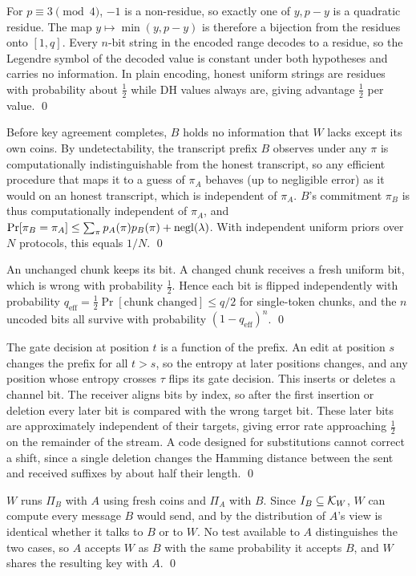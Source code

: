 For $p \equiv 3 \pmod 4$, $-1$ is a non-residue, so exactly one of $y, p-y$ is a quadratic residue. The map $y\mapsto\min(y,p-y)$ is therefore a bijection from the residues onto $[1,q]$. Every $n$-bit string in the encoded range decodes to a residue, so the Legendre symbol of the decoded value is constant under both hypotheses and carries no information. In plain encoding, honest uniform strings are residues with probability about $\tfrac12$ while DH values always are, giving advantage $\tfrac12$ per value. \qed

Before key agreement completes, $B$ holds no information that $W$ lacks except its own coins. By undetectability, the transcript prefix $B$ observes under any $\pi$ is computationally indistinguishable from the honest transcript, so any efficient procedure that maps it to a guess of $\pi_A$ behaves (up to negligible error) as it would on an honest transcript, which is independent of $\pi_A$. $B$'s commitment $\pi_B$ is thus computationally independent of $\pi_A$, and $\Pr[\pi_B=\pi_A] \leq \sum_\pi p_A(\pi)p_B(\pi) + \mathrm{negl}(\lambda)$. With independent uniform priors over $N$ protocols, this equals $1/N$. \qed

An unchanged chunk keeps its bit. A changed chunk receives a fresh uniform bit, which is wrong with probability $\tfrac12$. Hence each bit is flipped independently with probability $q_{\mathrm{eff}} = \tfrac12\Pr[\text{chunk changed}] \leq q/2$ for single-token chunks, and the $n$ uncoded bits all survive with probability $(1-q_{\mathrm{eff}})^n$. \qed

The gate decision at position $t$ is a function of the prefix. An edit at position $s$ changes the prefix for all $t > s$, so the entropy at later positions changes, and any position whose entropy crosses $\tau$ flips its gate decision. This inserts or deletes a channel bit. The receiver aligns bits by index, so after the first insertion or deletion every later bit is compared with the wrong target bit. These later bits are approximately independent of their targets, giving error rate approaching $\tfrac12$ on the remainder of the stream. A code designed for substitutions cannot correct a shift, since a single deletion changes the Hamming distance between the sent and received suffixes by about half their length. \qed

$W$ runs $\Pi_B$ with $A$ using fresh coins and $\Pi_A$ with $B$. Since $I_B \subseteq \mathcal{K}_W$, $W$ can compute every message $B$ would send, and by  the distribution of $A$'s view is identical whether it talks to $B$ or to $W$. No test available to $A$ distinguishes the two cases, so $A$ accepts $W$ as $B$ with the same probability it accepts $B$, and $W$ shares the resulting key with $A$. \qed
